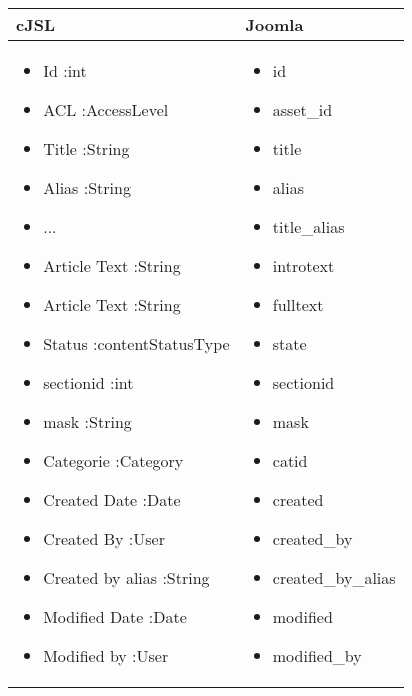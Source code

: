 \begin{minipage}{0.7\textwidth}
\begin{tabular}{|p{} | p{}|}
\hline
\textbf{cJSL} & \textbf{Joomla} \\ 
\hline
\begin{itemize}
\item Id :int
\item ACL :AccessLevel
\item Title :String
\item Alias :String
\item ...
\item Article Text :String
\item Article Text :String
\item Status :contentStatusType
\item sectionid :int
 \item mask :String
\item Categorie :Category
\item Created Date :Date
\item Created By :User
\item Created by alias :String
\item Modified Date :Date
\item Modified by :User

\end{itemize}
 & 
 \begin{itemize}
\item id 
 \item asset\_id 
 \item title 
 \item alias 
 \item title\_alias 
 \item introtext 
 \item fulltext 
 \item state 
 \item sectionid 
 \item mask 
 \item catid 
 \item created 
 \item created\_by 
 \item created\_by\_alias 
 \item modified 
 \item modified\_by 
 
 \end{itemize} 
\\
\hline
\end{tabular}
\end{minipage}



